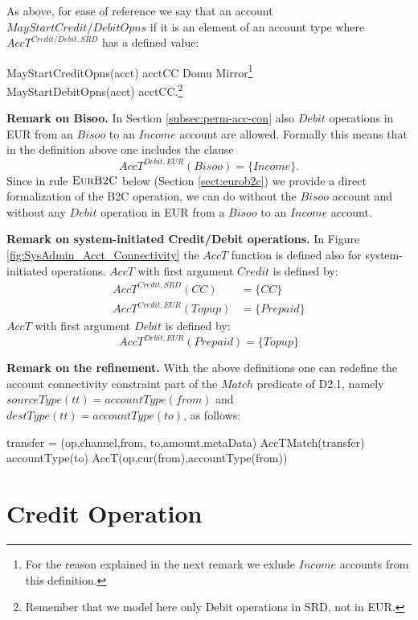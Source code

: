  As above, for ease of reference we say that an account $MayStartCredit/DebitOpns$ if it is an element of an account type where $AccT^{Credit/Debit,SRD}$ has a defined value: 
\begin{asm}
MayStartCreditOpns(acct) \IFF acct\in CC \cup Domu \cup Mirror\footnote{For the reason explained in the next remark we exlude $Income$ accounts from this definition.} \\
MayStartDebitOpns(acct) \IFF acct\in CC.\footnote{Remember that we model here only Debit operations in SRD, not in EUR.}
\end{asm}

{\bf Remark on Bisoo.}
In Section \ref{subsec:perm-acc-con} also $Debit$ operations in EUR from an $Bisoo$ to an $Income$ account are allowed. Formally this means that in the definition above one includes the clause
\[AccT^{Debit,EUR}(Bisoo) =\{Income\}.\]
Since in rule $\hbox{\sc EurB2C}$ below (Section \ref{sect:eurob2c}) we provide a direct formalization of the B2C operation, we can do without the $Bisoo$ account and without any $Debit$ operation in EUR from a $Bisoo$ to an $Income$ account.

{\bf Remark on system-initiated Credit/Debit operations.} In Figure \ref{fig:SysAdmin_Acct_Connectivity} the $AccT$ function is defined also for system-initiated operations. $AccT$ with first argument $Credit$ is defined by:
\begin{align*}
	AccT^{Credit,SRD}(CC) &= \{CC\}  \\ 
	AccT^{Credit,EUR}(Topup) &= \{Prepaid\}
\end{align*}
$AccT$ with first argument $Debit$ is defined by:
\[ AccT^{Debit,EUR}(Prepaid)=\{Topup\} \]

{\bf Remark on the refinement.} With the above definitions one can redefine the account connectivity constraint part of the $Match$ predicate of D2.1, namely $sourceType(tt)=accountType(from)$ and $destType(tt)=accountType(to)$, as follows:
\begin{asm}
\LET transfer = (op,channel,from, to,amount,metaData) \+
AccTMatch(transfer) \IFF ~~   accountType(to) \in AccT(op,cur(from),accountType(from))
\end{asm}

\section{Credit Operation} 
\label{sect:creditops}

